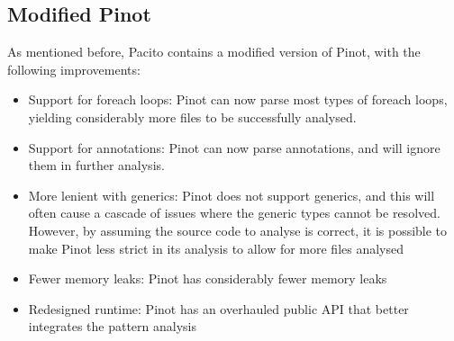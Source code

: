 \subsection{Modified Pinot}
As mentioned before, Pacito contains a modified version of Pinot, with the following improvements:
\begin{itemize}
    \item Support for foreach loops: Pinot can now parse most types of foreach loops, yielding considerably more files to be successfully analysed.
    \item Support for annotations: Pinot can now parse annotations, and will ignore them in further analysis.
    \item More lenient with generics: Pinot does not support generics, and this will often cause a cascade of issues where the generic types cannot be resolved. However, by assuming the source code to analyse is correct, it is possible to make Pinot less strict in its analysis to allow for more files analysed
    \item Fewer memory leaks: Pinot has considerably fewer memory leaks
    \item Redesigned runtime: Pinot has an overhauled public API that better integrates the pattern analysis
\end{itemize}

